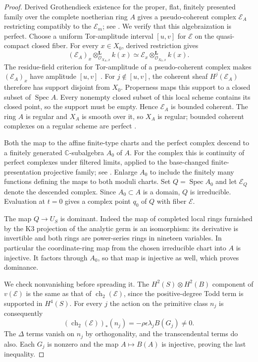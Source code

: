 \documentclass[11pt]{article}
\numberwithin{equation}{section}
\theoremstyle{definition}
\theoremstyle{remark}
\begin{document}
\begin{proof}
Derived Grothendieck existence for the proper, flat, finitely
presented family over the complete noetherian ring $A$ gives a
pseudo-coherent complex $\mathcal E_A$ restricting compatibly to
the $\mathcal E_m$; see \cite[Tag~0DIG]{Deformation:Stacks}.
We verify that this algebraization is perfect. Choose a uniform
Tor-amplitude interval $[u,v]$ for $\mathcal E$ on the quasi-compact
closed fiber. For every $x\in X_0$, derived restriction gives
\[
 (\mathcal E_A)_x\otimes^{\mathbf L}_{\mathcal O_{X_A,x}}k(x)
 \simeq
 \mathcal E_x\otimes^{\mathbf L}_{\mathcal O_{X_0,x}}k(x).
\]
The residue-field criterion for Tor-amplitude of a pseudo-coherent
complex makes $(\mathcal E_A)_x$ have amplitude $[u,v]$
\cite[Tag~068V]{Deformation:Stacks}. For $j\notin[u,v]$, the
coherent sheaf $H^j(\mathcal E_A)$ therefore has support disjoint
from $X_0$. Properness maps this support to a closed subset of
$\operatorname{Spec} A$. Every nonempty closed subset of this local scheme
contains its closed point, so the support must be empty. Hence
$\mathcal E_A$ is bounded coherent. The ring $A$ is regular and
$X_A$ is smooth over it, so $X_A$ is regular; bounded coherent
complexes on a regular scheme are perfect
\cite[Tags~036D and 0FDC]{Deformation:Stacks}.

Both the map to the affine finite-type charts and the perfect
complex descend to a finitely generated $\mathbb C$-subalgebra $A_0$ of
$A$. For the complex this is continuity of perfect complexes under
filtered limits, applied to the base-changed finite-presentation
projective family; see \cite[Tag~09RF]{Deformation:Stacks}.
Enlarge $A_0$ to include the finitely many functions defining the
maps to both moduli charts. Set $Q=\operatorname{Spec} A_0$ and let
$\mathcal E_Q$ denote the descended complex. Since $A_0\subset A$
is a domain, $Q$ is irreducible. Evaluation at $t=0$ gives a complex
point $q_0$ of $Q$ with fiber $\mathcal E$.

The map $Q\to U_S$ is dominant. Indeed the map of completed local
rings furnished by the K3 projection of the analytic germ is an
isomorphism: its derivative is invertible and both rings are
power-series rings in nineteen variables. In particular the
coordinate-ring map from the chosen irreducible chart into $A$
is injective. It factors through $A_0$, so that map is injective
as well, which proves dominance.

We check nonvanishing before spreading it. The $H^2(S)\otimes
H^2(B)$ component of $v(\mathcal E)$ is the same as that of
$\operatorname{ch}_2(\mathcal E)$, since the positive-degree Todd term is
supported in $H^4(S)$. For every $j$ the action on the primitive
class $n_j$ is consequently
\begin{equation}\label{eq:initial-cycle-nonzero}
 (\operatorname{ch}_2(\mathcal E))_*(n_j)
       =-\rho\epsilon\lambda_j B(G_j)\ne0.
\end{equation}
The $\Delta$ terms vanish on $n_j$ by orthogonality, and the
transcendental terms do also. Each $G_j$ is nonzero and the map
$A\mapsto B(A)$ is injective, proving the last inequality.


\end{proof}
\end{document}
